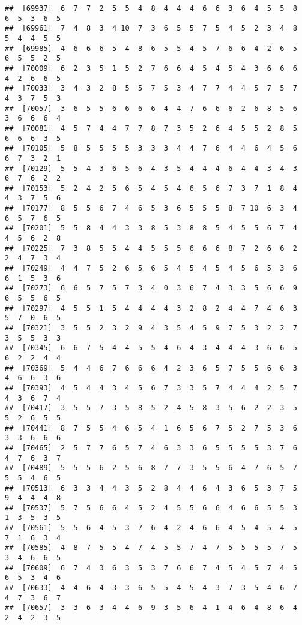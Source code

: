 \documentclass[
]{book}
\begin{document}
\begin{verbatim}
##  [69937]  6  7  7  2  5  5  4  8  4  4  4  6  6  3  6  4  5  5  8  6  5  3  6  5
##  [69961]  7  4  8  3  4 10  7  3  6  5  5  7  5  4  5  2  3  4  8  5  4  4  5  5
##  [69985]  4  6  6  6  5  4  8  6  5  5  4  5  7  6  6  4  2  6  5  6  5  5  2  5
##  [70009]  6  2  3  5  1  5  2  7  6  6  4  5  4  5  4  3  6  6  6  4  2  6  6  5
##  [70033]  3  4  3  2  8  5  5  7  5  3  4  7  7  4  4  5  7  5  7  4  3  7  5  3
##  [70057]  3  6  5  5  6  6  6  6  4  4  7  6  6  6  2  6  8  5  6  3  6  6  6  4
##  [70081]  4  5  7  4  4  7  7  8  7  3  5  2  6  4  5  5  2  8  5  6  6  6  3  5
##  [70105]  5  8  5  5  5  5  3  3  3  4  4  7  6  4  4  6  4  5  6  6  7  3  2  1
##  [70129]  5  5  4  3  6  5  6  4  3  5  4  4  4  6  4  4  3  4  3  6  7  6  2  2
##  [70153]  5  2  4  2  5  6  5  4  5  4  6  5  6  7  3  7  1  8  4  4  3  7  5  6
##  [70177]  8  5  5  6  7  4  6  5  3  6  5  5  5  8  7 10  6  3  4  6  5  7  6  5
##  [70201]  5  5  8  4  4  3  3  8  5  3  8  8  5  4  5  5  6  7  4  4  5  6  2  8
##  [70225]  7  3  8  5  5  4  4  5  5  5  6  6  6  8  7  2  6  6  2  2  4  7  3  4
##  [70249]  4  4  7  5  2  6  5  6  5  4  5  4  5  4  5  6  5  3  6  6  1  5  3  6
##  [70273]  6  6  5  7  5  7  3  4  0  3  6  7  4  3  3  5  6  6  9  6  5  5  6  5
##  [70297]  4  5  5  1  5  4  4  4  4  3  2  8  2  4  4  7  4  6  3  5  7  0  6  5
##  [70321]  3  5  5  2  3  2  9  4  3  5  4  5  9  7  5  3  2  2  7  3  5  5  3  3
##  [70345]  6  6  7  5  4  4  5  5  4  6  4  3  4  4  4  3  6  6  5  6  2  2  4  4
##  [70369]  5  4  4  6  7  6  6  6  4  2  3  6  5  7  5  5  6  6  3  4  6  6  3  6
##  [70393]  4  5  4  4  3  4  5  6  7  3  3  5  7  4  4  4  2  5  7  4  3  6  7  4
##  [70417]  3  5  5  7  3  5  8  5  2  4  5  8  3  5  6  2  2  3  5  5  2  6  5  5
##  [70441]  8  7  5  5  4  6  5  4  1  6  5  6  7  5  2  7  5  3  6  3  3  6  6  6
##  [70465]  2  5  7  7  6  5  7  4  6  3  3  6  5  5  5  5  3  7  6  4  7  6  3  7
##  [70489]  5  5  5  6  2  5  6  8  7  7  3  5  5  6  4  7  6  5  7  5  5  4  6  5
##  [70513]  6  3  3  4  4  3  5  2  8  4  4  6  4  3  6  5  3  7  5  9  4  4  4  8
##  [70537]  5  7  5  6  6  4  5  2  4  5  5  6  6  4  6  6  5  5  3  1  3  5  3  5
##  [70561]  5  5  6  4  5  3  7  6  4  2  4  6  6  4  5  4  5  4  5  7  1  6  3  4
##  [70585]  4  8  7  5  5  4  7  4  5  5  7  4  7  5  5  5  5  7  5  3  4  6  6  5
##  [70609]  6  7  4  3  6  3  5  3  7  6  6  7  4  5  4  5  7  4  5  6  5  3  4  6
##  [70633]  4  4  6  4  3  3  6  5  5  4  5  4  3  7  3  5  4  6  7  4  7  3  6  7
##  [70657]  3  3  6  3  4  4  6  9  3  5  6  4  1  4  6  4  8  6  4  2  4  2  3  5

\end{verbatim}
\end{document}

